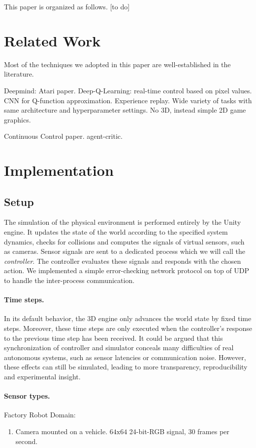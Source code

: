 \documentclass[10pt,a4paper]{article}
\begin{document}
This paper is organized as follows.
[to do]

\section{Related Work}

Most of the techniques we adopted in this paper are well-established in the literature.

Deepmind: Atari paper.
Deep-Q-Learning: real-time control based on pixel values. 
CNN for Q-function approximation. 
Experience replay.
Wide variety of tasks with same architecture and hyperparameter settings.
No 3D, instead simple 2D game graphics.


Continuous Control paper.
agent-critic.

\section{Implementation}

\subsection{Setup}
The simulation of the physical environment is performed entirely by the Unity engine.
It updates the state of the world according to the specified system dynamics, checks for collisions and computes the signals of virtual sensors, such as cameras.
Sensor signals are sent to a dedicated process which we will call the \emph{controller}.
The controller evaluates these signals and responds with the chosen action.
We implemented a simple error-checking network protocol on top of UDP to handle the inter-process communication.


\paragraph{Time steps.}
In its default behavior, the 3D engine only advances the world state by fixed time steps. %
Moreover, these time steps are only executed when the controller's response to the previous time step has been received.
It could be argued that this synchronization of controller and simulator conceals many difficulties of real autonomous systems, such as sensor latencies or communication noise.
However, these effects can still be simulated, leading to more transparency, reproducibility and experimental insight.

\paragraph{Sensor types.}
Factory Robot Domain:
\begin{enumerate}
\item Camera mounted on a vehicle. $64\mathrm{x}64$ 24-bit-RGB signal, $30$ frames per second. 
\end{enumerate}
\end{document}
